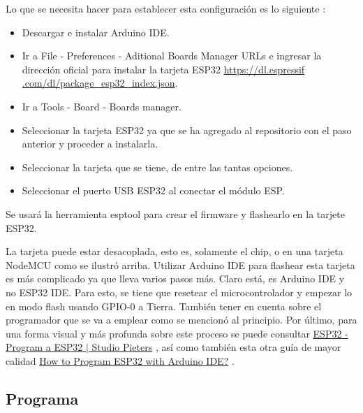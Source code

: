 \documentclass[conference]{IEEEtran}
\begin{document}
\bigbreak

Lo que se necesita hacer para establecer esta configuración es lo siguiente
\cite{pieters-2022}:

\begin{itemize}
    \item Descargar e instalar Arduino IDE.

    \item Ir a File - Preferences - Aditional Boards Manager URLs e ingresar la
    dirección oficial para instalar la tarjeta ESP32 \url{https://dl.espressif
    .com/dl/package_esp32_index.json}.

    \item Ir a Tools - Board - Boards manager.

    \item Seleccionar la tarjeta ESP32 ya que se ha agregado al repositorio con
    el paso anterior y proceder a instalarla.

    \item Seleccionar la tarjeta que se tiene, de entre las tantas opciones.

    \item Seleccionar el puerto USB ESP32 al conectar el módulo ESP.
\end{itemize}

Se usará la herramienta esptool para crear el firmware y flashearlo en la
tarjete ESP32.

\bigbreak

La tarjeta puede estar desacoplada, esto es, solamente el chip, o en una
tarjeta NodeMCU como se ilustró arriba. Utilizar Arduino IDE para flashear
esta tarjeta es más complicado ya que lleva varios pasos más. Claro está, es
Arduino IDE y no ESP32 IDE. Para esto, se tiene que resetear el
microcontrolador y empezar lo en modo flash usando GPIO-0 a Tierra. También
tener en cuenta sobre el programador que se va a emplear como se mencionó al
principio. Por último, para una forma visual y más profunda sobre este
proceso se puede consultar
\href{https://www.studiopieters.nl/esp32-program-a-esp32}{ESP32 - Program a ESP32 $\mid$ Studio Pieters}
\cite{pieters-2022}, así como también esta otra guía de mayor calidad
\href{https://www.electronicshub.org/esp32-arduino-ide}{How to Program ESP32 with Arduino IDE?} \cite{teja-2021}.

\subsection{Programa}
\end{document}
